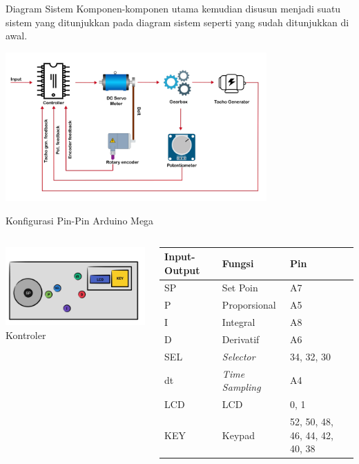\documentclass[10pt,xcolor={dvipsnames}]{beamer}
\begin{document}
\begin{frame}{Diagram Sistem}
	Komponen-komponen utama kemudian disusun menjadi suatu sistem yang ditunjukkan pada diagram sistem seperti yang sudah ditunjukkan di awal.
	\begin{center}
		\includegraphics[width=10cm]{Gambar Lain/diagramDCservo.png}
	\end{center}
\end{frame}
\begin{frame}{Konfigurasi Pin-Pin Arduino Mega}
	\begin{columns}[T]
		\begin{column}{0.48\textwidth}
			\centering
			\includegraphics[width=6cm]{Gambar Lain/KONTORU.jpg}
			Kontroler
		\end{column}
		\begin{column}{0.48\textwidth}
			\begin{tabular}{ | m{1cm} | m{2cm}| m{2cm}|} 
				\hline
				\textbf{Input-Output} & \textbf{Fungsi} & \textbf{Pin} \\ 
				\hline
				SP & Set Poin & A7\\ 
				\hline
				P & Proporsional & A5 \\
				\hline
				I & Integral & A8 \\
				\hline
				D & Derivatif & A6 \\
				\hline
				SEL & \textit{Selector} & 34, 32, 30 \\
				\hline
				dt & \textit{Time Sampling} & A4 \\
				\hline
				LCD & LCD & 0, 1 \\
				\hline
				KEY & Keypad & 52, 50, 48, 46, 44, 42, 40, 38 \\
				\hline
			\end{tabular}
		\end{column}
	\end{columns}
\end{frame}
\end{document}
